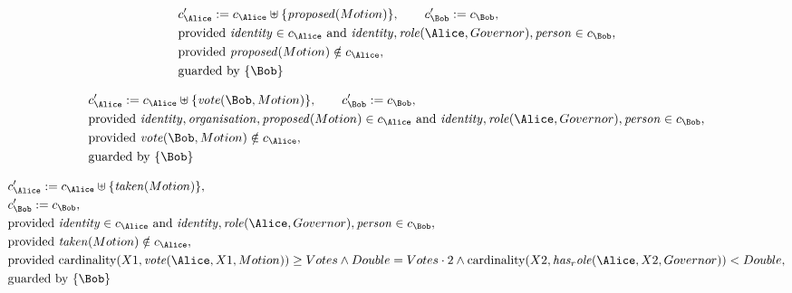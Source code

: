 \begin{align*}
&
c'_
{
\Alice
}
 := 
c_
{
\Alice
}
 \uplus 
\{
\mathit{
proposed
}
(
Motion
)
\}
, \qquad 
c'_
{
\Bob
}
 := 
c_
{
\Bob
}
,\\
&
\text{provided } 
\mathit{
identity
}
 \in c_
{
\Alice
}
 \text{ and } 
\mathit{
identity
}
,
\mathit{
role
}
(
\Alice
,
Governor
)
,
\mathit{
person
}
 \in c_
{
\Bob
}
,\\
&
\text{provided } 
\mathit{
proposed
}
(
Motion
)
 \notin c_
{
\Alice
}
,\\
&
\text{guarded by } \{
\Bob
\}
\end{align*}

\begin{align*}
&
c'_
{
\Alice
}
 := 
c_
{
\Alice
}
 \uplus 
\{
\mathit{
vote
}
(
\Bob
,
Motion
)
\}
, \qquad 
c'_
{
\Bob
}
 := 
c_
{
\Bob
}
,\\
&
\text{provided } 
\mathit{
identity
}
,
\mathit{
organisation
}
,
\mathit{
proposed
}
(
Motion
)
 \in c_
{
\Alice
}
 \text{ and } 
\mathit{
identity
}
,
\mathit{
role
}
(
\Alice
,
Governor
)
,
\mathit{
person
}
 \in c_
{
\Bob
}
,\\
&
\text{provided } 
\mathit{
vote
}
(
\Bob
,
Motion
)
 \notin c_
{
\Alice
}
,\\
&
\text{guarded by } \{
\Bob
\}
\end{align*}

\begin{align*}
&
c'_
{
\Alice
}
 := 
c_
{
\Alice
}
 \uplus 
\{
\mathit{
taken
}
(
Motion
)
\}
,\\
&
c'_
{
\Bob
}
 := 
c_
{
\Bob
}
,\\
&
\text{provided } 
\mathit{
identity
}
 \in c_
{
\Alice
}
 \text{ and } 
\mathit{
identity
}
,
\mathit{
role
}
(
\Alice
,
Governor
)
,
\mathit{
person
}
 \in c_
{
\Bob
}
,\\
&
\text{provided } 
\mathit{
taken
}
(
Motion
)
 \notin c_
{
\Alice
}
,\\
&
\text{provided } 
\mathrm{cardinality}(
X1
,
\mathit{
vote
}
(
\Alice
,
X1
,
Motion
)
)
\ge
Votes
\land
Double
=
Votes
\cdot
2
\land
\mathrm{cardinality}(
X2
,
\mathit{
has_role
}
(
\Alice
,
X2
,
Governor
)
)
<
Double
,\\
&
\text{guarded by } \{
\Bob
\}
\end{align*}

